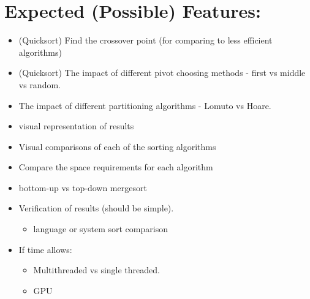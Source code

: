 \documentclass{article}
\begin{document}
\section*{Expected (Possible) Features:} 
\begin{itemize}
\item (Quicksort) Find the crossover point (for comparing to less efficient algorithms)
\item (Quicksort) The impact of different pivot choosing methods - first vs middle vs random.
\item The impact of different partitioning algorithms - Lomuto vs Hoare.
\item visual representation of results
\item Visual comparisons of each of the sorting algorithms
\item Compare the space requirements for each algorithm
\item bottom-up vs top-down mergesort
\item Verification of results (should be simple).
\begin{itemize}
\item language or system sort comparison
\end{itemize}
\item If time allows: 
\begin{itemize}
\item Multithreaded vs single threaded.
\item GPU
\end{itemize}
\end{itemize}
\end{document}

